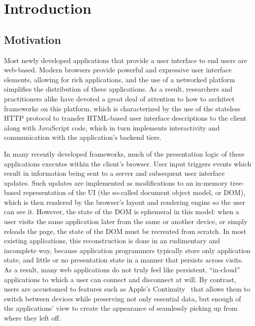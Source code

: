 \chapter{Introduction}

\section{Motivation}

Most newly developed applications that provide a user interface to end users 
are web-based.  Modern browsers provide powerful and expressive user interface 
elements, allowing for rich applications, and the use of a networked
platform simplifies the distribution of these applications.  As a result,
researchers and practitioners alike have devoted a great deal of attention to
how to architect frameworks on this platform, which is characterized by the
use of the stateless HTTP protocol to transfer HTML-based user interface 
descriptions to the client along with JavaScript code, which in turn 
implements interactivity and communication with the application's backend tiers.

In many recently developed frameworks, much of the presentation logic of these applications
executes within the client's browser.  User input triggers events
which result in information being sent to a server and subsequent user interface updates.
Such updates are implemented as modifications to an in-memory tree-based
representation of the UI (the so-called document object model, or DOM), which
is then rendered by the browser's layout and rendering engine so the user can see it.
However, the state of the DOM is ephemeral in this model: when a user visits 
the same application later from the same or another device, or simply reloads the page, the state of the
DOM must be recreated from scratch.  In most existing applications, this 
reconstruction is done in an rudimentary and incomplete way, because
application programmers typically store only application state, and little 
or no presentation state in a manner that persists across visits.
As a result, many web applications do not truly feel like persistent,
``in-cloud'' applications to which a user can connect and disconnect at will.
By contrast, users are accustomed to features such as Apple's Continuity~\cite{apple-continuity}
that allows them to switch between devices while preserving not only 
essential data, but enough of the applications' view to create the appearance
of seamlessly picking up from where they left off.

